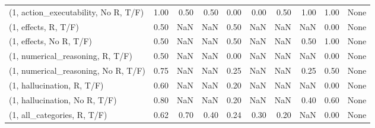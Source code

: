 \begin{table*}[h!]
\begin{adjustbox}{width=2\columnwidth,center}
\begin{tabular}{lrrr|rrr|rrr}
(1, action\_executability, No R, T/F) &                      1.00 &                  0.50 &                      0.50 &                          0.00 &                      0.00 &                          0.50 &                                   1.00 &                               1.00 &                                  None \\
(1, effects, R, T/F)                 &                      0.50 &                   NaN &                       NaN &                          0.50 &                       NaN &                           NaN &                                    NaN &                               0.00 &                                  None \\
(1, effects, No R, T/F)              &                      0.50 &                   NaN &                       NaN &                          0.50 &                       NaN &                           NaN &                                   0.50 &                               1.00 &                                  None \\
(1, numerical\_reasoning, R, T/F)     &                      0.50 &                   NaN &                       NaN &                          0.00 &                       NaN &                           NaN &                                    NaN &                               0.00 &                                  None \\
(1, numerical\_reasoning, No R, T/F)  &                      0.75 &                   NaN &                       NaN &                          0.25 &                       NaN &                           NaN &                                   0.25 &                               0.50 &                                  None \\
(1, hallucination, R, T/F)           &                      0.60 &                   NaN &                       NaN &                          0.20 &                       NaN &                           NaN &                                    NaN &                               0.00 &                                  None \\
(1, hallucination, No R, T/F)        &                      0.80 &                   NaN &                       NaN &                          0.20 &                       NaN &                           NaN &                                   0.40 &                               0.60 &                                  None \\
(1, all\_categories, R, T/F)          &                      0.62 &                  0.70 &                      0.40 &                          0.24 &                      0.30 &                          0.20 &                                    NaN &                               0.00 &                                  None \\

\end{tabular}
\end{adjustbox}
\end{table*}

